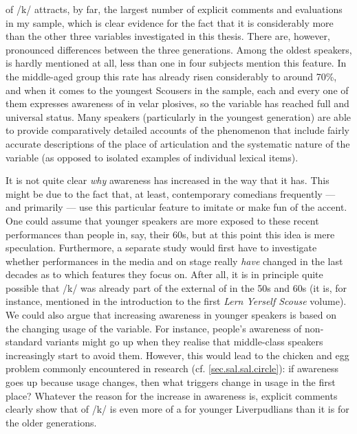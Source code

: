 of /k/ attracts, by far, the largest number of explicit comments and evaluations in my sample, which is clear evidence for the fact that it is considerably more  than the other three variables investigated in this thesis.
There are, however, pronounced differences between the three generations.
Among the oldest speakers,  is hardly mentioned at all, less than one in four subjects mention this feature.
In the middle-aged group this rate has already risen considerably to around 70\%, and when it comes to the youngest Scousers in the sample, each and every one of them expresses  awareness of  in velar plosives, so the variable has reached full and universal  status.
Many speakers (particularly in the youngest generation) are able to provide comparatively detailed accounts of the phenomenon that include fairly accurate descriptions of the place of articulation and the systematic nature of the variable (as opposed to isolated examples of individual lexical items).

It is not quite clear \emph{why} awareness has increased in the way that it has.
This might be due to the fact that,  at least, contemporary comedians frequently --- and primarily --- use this particular feature to imitate or make fun of the  accent.
One could assume that younger speakers are more exposed to these recent performances than people in, say, their 60s, but at this point this idea is mere speculation.
Furthermore, a separate study would first have to investigate whether performances in the media and on stage really \emph{have} changed in the last decades as to which features they focus on.
After all, it is in principle quite possible that /k/  was already part of the external  of  in the 50s and 60s (it is, for instance, mentioned in the introduction to the first \emph{Lern Yerself Scouse} volume).
We could also argue that increasing awareness in younger speakers is based on the changing usage of the variable.
For instance, people's awareness of non-standard variants might go up when they realise that middle-class speakers increasingly start to avoid them.
However, this would lead to the chicken and egg problem commonly encountered in  research (cf. \ref{sec.sal.sal.circle}): if awareness goes up because usage changes, then what triggers change in usage in the first place?
Whatever the reason for the increase in  awareness is, explicit comments clearly show that  of /k/ is even more of a  for younger Liverpudlians than it is for the older generations.

